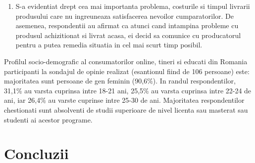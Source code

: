 \documentclass[a4paper, 12pt]{article}
\begin{document}
\begin{enumerate}[1.]
	\item S-a evidentiat drept cea mai importanta problema, costurile si timpul livrarii produsului care nu ingreuneaza satisfacerea nevoilor cumparatorilor. De asemenea, respondentii au afirmat ca atunci cand intampina probleme cu produsul achizitionat si livrat acasa, ei decid sa comunice cu producatorul pentru a putea remedia situatia in cel mai scurt timp posibil.
	\end{enumerate}
	
	\quad Profilul socio-demografic al consumatorilor online, tineri si educati din Romania participanti la sondajul de opinie realizat (esantionul fiind de 106 persoane) este: majoritatea sunt persoane de gen feminin (90,6\%). In randul respondentilor, 31,1\% au varsta cuprinsa intre 18-21 ani, 25,5\% au varsta cuprinsa intre 22-24 de ani, iar 26,4\% au varste cuprinse intre 25-30 de ani. Majoritatea respondentilor chestionati sunt absolventi de studii superioare de nivel licenta sau masterat sau studenti ai acestor programe. 
	
	

	
	\newpage 
	\section{Concluzii}
	\newpage
	
	
\newpage 



\newpage 
\end{document}
